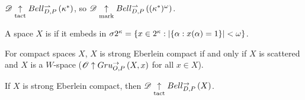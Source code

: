 \documentclass[11pt]{article}
\begin{document}
  \begin{example}
    $\mathscr{D}\underset{\text{tact}}{\uparrow} Bell_{D,P}^{\rightharpoonup}\left({\kappa^*}\right)$,
    so $\mathscr{D}\underset{\text{mark}}{\uparrow} Bell_{D,P}^{\rightharpoonup}\left({(\kappa^*)^\omega}\right)$.
  \end{example}







  \begin{definition}
    A space $X$ is  if it embeds in
    $\sigma2^{\kappa}=\{x\in2^\kappa:|\{\alpha:x(\alpha)=1\}|<\omega\}$.
  \end{definition}

  \begin{theorem}[Gruenhage]
    For compact spaces $X$,
    $X$ is strong Eberlein compact if and only if
    $X$ is scattered and $X$ is a $W$-space
    ($\mathscr{O}\uparrow Gru_{O,P}^{\to}\left({X},{x}\right)$ for all $x\in X$).
  \end{theorem}

  \begin{theorem}
    If $X$ is strong Eberlein compact, then
    $\mathscr{D}\underset{\text{tact}}{\uparrow}Bell_{D,P}^{\to}\left({X}\right)$.
  \end{theorem}
\end{document}
